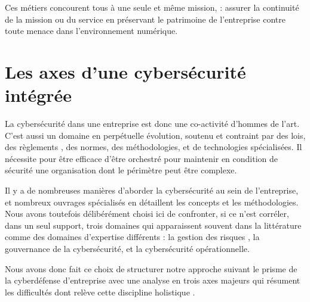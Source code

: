 Ces métiers concourent tous à une seule et même mission, : assurer la continuité de la mission ou du service en préservant le patrimoine de l'entreprise contre toute menace dans l'environnement numérique.





\section{Les axes d'une cybersécurité intégrée}


La cybersécurité dans une entreprise est donc une co-activité d'hommes de l'art.  C'est aussi un domaine en perpétuelle évolution, soutenu et contraint par des lois, des règlements , des normes, des méthodologies, et de technologies spécialisées.  Il nécessite pour être efficace d'être orchestré pour maintenir en condition de sécurité une organisation dont le périmètre peut être complexe.

Il y a de nombreuses manières d’aborder la cybersécurité au sein de l’entreprise, et nombreux ouvrages spécialisés en détaillent les concepts et les méthodologies. Nous avons toutefois délibérément choisi ici de confronter, si ce n'est corréler, dans un seul support, trois domaines qui apparaissent souvent dans la littérature comme des domaines d'expertise différents : la gestion des risques , la gouvernance de la cybersécurité, et la cybersécurité opérationnelle. 

Nous avons donc fait ce choix de structurer notre approche suivant le prisme de la cyberdéfense d'entreprise avec une analyse en trois axes majeurs qui résument les difficultés dont relève cette discipline holistique \cite{sch13}. 



